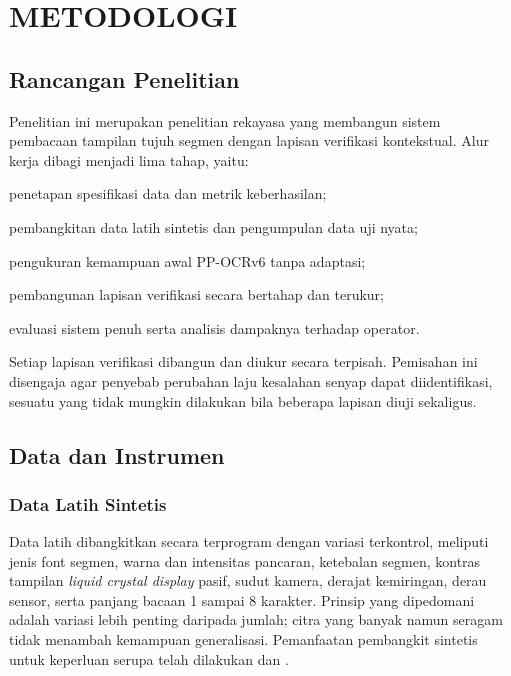 
\chapter{METODOLOGI}

\section{Rancangan Penelitian}

Penelitian ini merupakan penelitian rekayasa yang membangun sistem pembacaan
tampilan tujuh segmen dengan lapisan verifikasi kontekstual. Alur kerja dibagi
menjadi lima tahap, yaitu:
\begin{urut}
  \item penetapan spesifikasi data dan metrik keberhasilan;
  \item pembangkitan data latih sintetis dan pengumpulan data uji nyata;
  \item pengukuran kemampuan awal PP-OCRv6 tanpa adaptasi;
  \item pembangunan lapisan verifikasi secara bertahap dan terukur;
  \item evaluasi sistem penuh serta analisis dampaknya terhadap operator.
\end{urut}

Setiap lapisan verifikasi dibangun dan diukur secara terpisah. Pemisahan ini
disengaja agar penyebab perubahan laju kesalahan senyap dapat diidentifikasi,
sesuatu yang tidak mungkin dilakukan bila beberapa lapisan diuji sekaligus.

\section{Data dan Instrumen}

\subsection{Data Latih Sintetis}

Data latih dibangkitkan secara terprogram dengan variasi terkontrol, meliputi
jenis font segmen, warna dan intensitas pancaran, ketebalan segmen, kontras
tampilan \textit{liquid crystal display} pasif, sudut kamera, derajat
kemiringan, derau sensor, serta panjang bacaan 1 sampai 8 karakter. Prinsip yang
dipedomani adalah variasi lebih penting daripada jumlah; citra yang banyak namun
seragam tidak menambah kemampuan generalisasi. Pemanfaatan pembangkit sintetis
untuk keperluan serupa telah dilakukan \textcite{gushima2023automatic} dan
\textcite{yenneti2023lightweight}.


